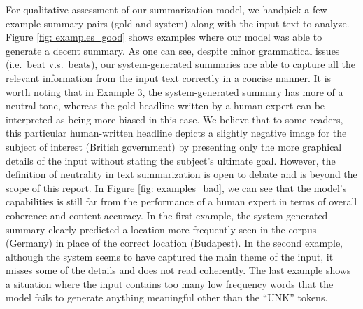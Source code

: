 For qualitative assessment of our summarization model, we handpick a few example summary pairs (gold and system) along with the input text to analyze. Figure \ref{fig: examples_good} shows examples where our model was able to generate a decent summary. As one can see, despite minor grammatical issues (i.e.\ beat v.s.\ beats), our system-generated summaries are able to capture all the relevant information from the input text correctly in a concise manner. It is worth noting that in Example 3, the system-generated summary has more of a neutral tone, whereas the gold headline written by a human expert can be interpreted as being more biased in this case. We believe that to some readers, this particular human-written headline depicts a slightly negative image for the subject of interest (British government) by presenting only the more graphical details of the input without stating the subject's ultimate goal. However, the definition of neutrality in text summarization is open to debate and is beyond the scope of this report. In Figure \ref{fig: examples_bad}, we can see that the model's capabilities is still far from the performance of a human expert in terms of overall coherence and content accuracy. In the first example, the system-generated summary clearly predicted a location more frequently seen in the corpus (Germany) in place of the correct location (Budapest). In the second example, although the system seems to have captured the main theme of the input, it misses some of the details and does not read coherently. The last example shows a situation where the input contains too many low frequency words that the model fails to generate anything meaningful other than the ``UNK'' tokens. 
